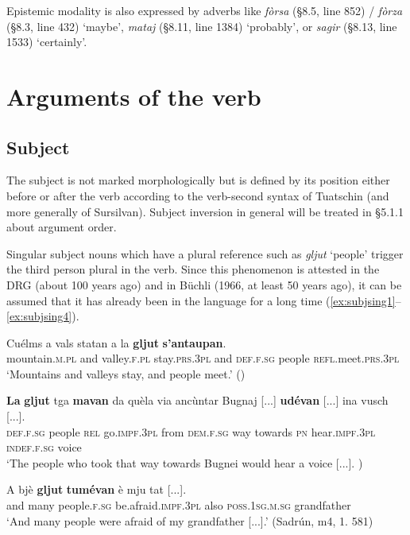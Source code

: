 Epistemic modality is also expressed by adverbs like \textit{fòrsa} (§8.5, line 852) / \textit{fòrza} (§8.3, line 432) `maybe', \textit{mataj} (§8.11, line 1384) `probably', or \textit{sagir} (§8.13, line 1533) `certainly'.


\section{Arguments of the verb} 

\subsection{Subject}
The subject is not marked morphologically but is defined by its position either before or after the verb according to the verb-second syntax of Tuatschin (and more generally of Sursilvan). Subject inversion in general will be treated in §5.1.1 about argument order.

Singular subject nouns which have a plural reference such as \textit{gljut} `people' trigger the third person plural in the verb. Since this phenomenon is attested in the DRG (about 100 years ago) and in Büchli (1966, at least 50 years ago), it can be assumed that it has already been in the language for a long time (\ref{ex:subjsing1}--\ref{ex:subjsing4}).

\ea
\label{ex:subjsing1}
\gll Cuélms a vals statan a la \textbf{gljut} \textbf{s'antaupan}.\\
mountain.\textsc{m.pl} and valley.\textsc{f.pl} stay.\textsc{prs.3pl} and \textsc{def.f.sg} people \textsc{refl}.meet.\textsc{prs.3pl}\\
\glt `Mountains and valleys stay, and people meet.' ()
\z

\ea
\label{ex:subjsing2}
\gll \textbf{La} \textbf{gljut} tga \textbf{mavan} da quèla via ancùntar Bugnaj [...] \textbf{udévan} [...] ina vusch [...].\\
\textsc{def.f.sg} people \textsc{rel} go.\textsc{impf.3pl} from \textsc{dem.f.sg} way towards \textsc{pn} {} hear.\textsc{impf.3pl} {} \textsc{indef.f.sg} voice\\
\glt `The people who took that way towards Bugnei would hear a voice [...]. \citealt[142f.]{Büchli1966})
\z

\ea
\label{ex:subjsing3}
\gll  A bjè \textbf{gljut} \textbf{tumévan} è mju tat [...].  \\
and many people.\textsc{f.sg} be.afraid.\textsc{impf.3pl} also \textsc{poss.1sg.m.sg} grandfather\\
\glt `And many people were afraid of my grandfather [...].' (Sadrún, m4, 1. 581)
\z

